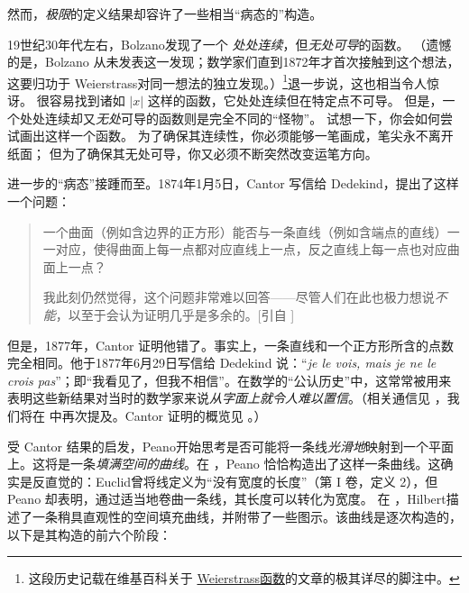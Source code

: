 \documentclass[../../../include/open-logic-section]{subfiles}
\begin{document}

然而，\emph{极限}的定义结果却容许了一些相当“病态的”构造。

19世纪30年代左右，Bolzano发现了一个
\emph{处处连续}，但\emph{无处可导}的函数。
（遗憾的是，Bolzano 从未发表这一发现；数学家们直到1872年才首次接触到这个想法，这要归功于 Weierstrass对同一想法的独立发现。）\footnote{这段历史记载在维基百科关于
\href{http://en.wikipedia.org/wiki/Weierstrass_function}{Weierstrass函数}的文章的极其详尽的脚注中。}退一步说，这也相当令人惊讶。
很容易找到诸如 $|x|$ 这样的函数，它处处连续但在特定点不可导。
但是，一个处处连续却又\emph{无处}可导的函数则是完全不同的“怪物”。
试想一下，你会如何尝试画出这样一个函数。
为了确保其连续性，你必须能够一笔画成，笔尖永不离开纸面；
但为了确保其无处可导，你又必须不断突然改变运笔方向。

进一步的“病态”接踵而至。1874年1月5日，Cantor 写信给 Dedekind，提出了这样一个问题：

\begin{quote}
一个曲面（例如含边界的正方形）能否与一条直线（例如含端点的直线）一一对应，使得曲面上每一点都对应直线上一点，反之直线上每一点也对应曲面上一点？

我此刻仍然觉得，这个问题非常难以回答——尽管人们在此也极力想说\emph{不能}，以至于会认为证明几乎是多余的。[引自 \citealt{Gouvea2011}]
\end{quote}

但是，1877年，Cantor 证明他错了。事实上，一条直线和一个正方形所含的点数完全相同。他于1877年6月29日写信给 Dedekind 说：“\emph{je le vois, mais je ne le crois pas}”；即“我看见了，但我不相信”。在数学的“公认历史”中，这常常被用来表明这些新结果对当时的数学家来说\emph{从字面上就令人难以置信}。（相关通信见 \citet{Gouvea2011}，我们将在  中再次提及。Cantor 证明的概览见 。）

受 Cantor 结果的启发，Peano开始思考是否可能将一条线\emph{光滑地}映射到一个平面上。这将是一条\emph{填满空间的曲线}。在 \citeyear{Peano1890}，Peano 恰恰构造出了这样一条曲线。这确实是反直觉的：Euclid曾将线定义为“没有宽度的长度”（第 I 卷，定义 2），但 Peano 却表明，通过适当地卷曲一条线，其长度可以转化为宽度。
在 \citeyear{Hilbert1891}，Hilbert描述了一条稍具直观性的空间填充曲线，并附带了一些图示。该曲线是逐次构造的，以下是其构造的前六个阶段：
\end{document}
